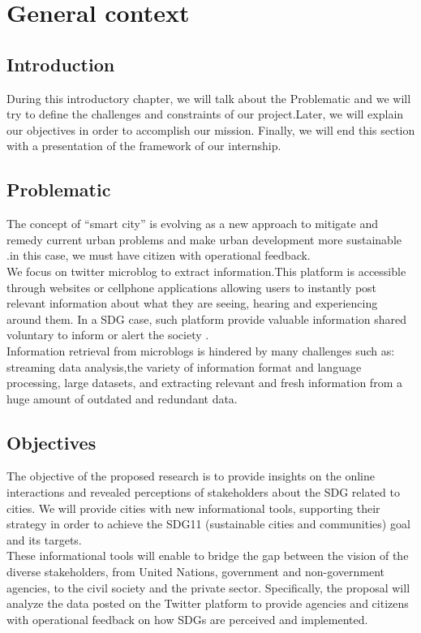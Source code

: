 \chapter{General context}
\section{Introduction}
During this introductory chapter, we will talk about the Problematic and we will try to define the challenges and constraints of our project.Later, we will explain our objectives in order to accomplish our mission. Finally, we will end this section with a presentation of the framework of our internship.
\section{Problematic}
The concept of “smart city” is evolving as a new approach to mitigate and remedy current urban problems and make urban development more sustainable \cite{Alawadhi2012}.in this case, we must have citizen with operational feedback.\\
We focus on twitter microblog to extract  information.This platform is accessible through websites or cellphone applications allowing users to instantly post relevant information about what they are seeing, hearing and experiencing around them. In a SDG case, such platform provide valuable information shared voluntary to inform or alert the society .\\
Information retrieval from microblogs is hindered by many challenges such as: streaming data analysis,the variety of information format and language processing, large datasets, and extracting relevant and fresh information from a huge amount of outdated and redundant data.
\section{Objectives}
The objective of the proposed research is to provide insights on the online interactions and revealed perceptions of stakeholders about the SDG related to cities. We will provide cities with new informational tools, supporting their strategy in order to achieve the SDG11
(sustainable cities and communities) goal and its targets. 
\\
These informational tools will enable to bridge the gap between the vision of the diverse stakeholders, from United Nations, government and non-government agencies, to the civil society and the private sector. Specifically, the proposal will analyze the data posted on the Twitter platform to provide agencies and citizens with operational feedback on how SDGs are perceived and implemented.

